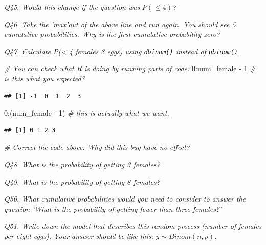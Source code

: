 \documentclass[
  11pt,
  a4paper,
]{book}
\newenvironment{Shaded}{\begin{snugshade}}{\end{snugshade}}
\newcommand{\CommentTok}[1]{\textcolor[rgb]{0.56,0.35,0.01}{\textit{#1}}}
\newcommand{\DecValTok}[1]{\textcolor[rgb]{0.00,0.00,0.81}{#1}}
\newcommand{\NormalTok}[1]{#1}
\newcommand{\SpecialCharTok}[1]{\textcolor[rgb]{0.00,0.00,0.00}{#1}}
\begin{document}
\emph{Q45. Would this change if the question was} \(P( \leq 4)\)\emph{?}

\emph{Q46. Take the 'max'out of the above line and run again. You should see 5 cumulative probabilities. Why is the first cumulative probability zero?}

\emph{Q47. Calculate P(\textless{} 4 females \textbar{} 8 eggs) using \texttt{dbinom()} instead of \texttt{pbinom()}.}

\begin{Shaded}
\begin{Highlighting}[]
\CommentTok{\# You can check what R is doing by running parts of code:}
\DecValTok{0}\SpecialCharTok{:}\NormalTok{num\_female }\SpecialCharTok{{-}} \DecValTok{1} \CommentTok{\# is this what you expected?}
\end{Highlighting}
\end{Shaded}

\begin{verbatim}
## [1] -1  0  1  2  3
\end{verbatim}

\begin{Shaded}
\begin{Highlighting}[]
\DecValTok{0}\SpecialCharTok{:}\NormalTok{(num\_female }\SpecialCharTok{{-}} \DecValTok{1}\NormalTok{) }\CommentTok{\# this is actually what we want.}
\end{Highlighting}
\end{Shaded}

\begin{verbatim}
## [1] 0 1 2 3
\end{verbatim}

\begin{Shaded}
\begin{Highlighting}[]
\CommentTok{\# Correct the code above. Why did this bug have no effect?}
\end{Highlighting}
\end{Shaded}

\emph{Q48. What is the probability of getting 3 females?}

\emph{Q49. What is the probability of getting 8 females?}

\emph{Q50. What cumulative probabilities would you need to consider to answer the question `What is the probability of getting fewer than three females?'}

\emph{Q51. Write down the model that describes this random process (number of females per eight eggs). Your answer should be like this: }\(y \sim Binom(n, p)\)\emph{.}
\end{document}
